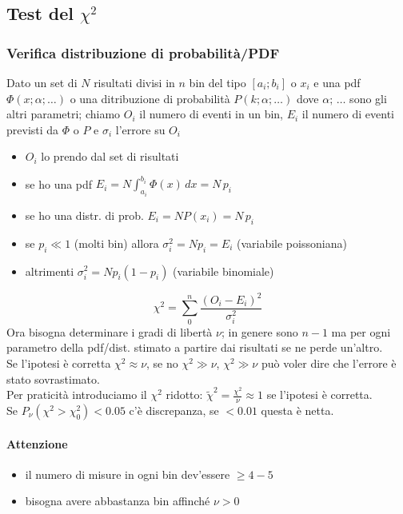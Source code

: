 \documentclass[11pt]{article}
\begin{document}
    \subsection{Test del $\chi^2$}
    \subsubsection{Verifica distribuzione di probabilità/PDF}
    Dato un set di $N$ risultati divisi in $n$ bin del tipo $[a_i; b_i]$ o $x_i$ e una pdf $ \Phi(x; \alpha; \dots) $ o
    una ditribuzione di probabilità $P(k; \alpha; \dots)$ dove $ \alpha; \, \dots $ sono gli altri parametri;
    chiamo $O_i$ il numero di eventi in un bin, $E_i$ il numero di eventi previsti da $\Phi$ o $P$ e $\sigma_i$ l'errore
    su $O_i$
    \begin{itemize}
        \item $O_i$ lo prendo dal set di risultati
        \item se ho una pdf $E_i = N \int_{a_i}^{b_i} \Phi(x) \, dx = N \, p_i $
        \item se ho una distr. di prob. $E_i = N P(x_i) = N \, p_i $
        \item se $p_i \ll 1 $ (molti bin) allora $\sigma_i^2 = Np_i = E_i $ (variabile poissoniana)
        \item altrimenti $\sigma_i^2 = N p_i (1 - p_i) $ (variabile binomiale)
    \end{itemize}
    \[ \chi^2 = \sum_{0}^{n} \frac{\left( O_i - E_i \right)^2}{\sigma_i^2} \]
    Ora bisogna determinare i gradi di libertà $\nu$;
    in genere sono $n -1$ ma per ogni parametro della pdf/dist. stimato a partire dai risultati se ne
    perde un'altro. \\
    Se l'ipotesi è corretta $ \chi^2 \approx \nu $, se no $ \chi^2 \gg \nu $, $ \chi^2 \gg \nu $ può voler dire che
    l'errore è stato sovrastimato. \\
    Per praticità introduciamo il $\chi^2$ ridotto: $ \tilde{\chi}^2 = \frac{\chi^2}{\nu} \approx 1 $ se l'ipotesi è corretta. \\
    Se $P_\nu (\chi^2 > \chi_0^2) < 0.05$ c'è discrepanza, se $< 0.01$ questa è netta.
    \paragraph{Attenzione}
    \begin{itemize}
        \item il numero di misure in ogni bin dev'essere $\geq 4-5$
        \item bisogna avere abbastanza bin affinché $\nu > 0$
    \end{itemize}
    
\end{document}
